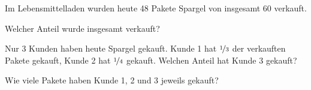 \begin{aufgabe}[subtitle=Spargelpakete]
	Im Lebensmittelladen wurden heute 48 Pakete Spargel von insgesamt 60 verkauft.
	\begin{teilaufgaben}
		\teilaufgabe
		Welcher Anteil wurde insgesamt verkauft?
		
		\teilaufgabe
		Nur 3 Kunden haben heute Spargel gekauft. Kunde 1 hat $\nicefrac{1}{3}$ der verkauften Pakete gekauft,
		Kunde 2 hat $\nicefrac{1}{4}$ gekauft. Welchen Anteil 
		hat Kunde 3 gekauft?
		
		\teilaufgabe
		Wie viele Pakete haben Kunde 1, 2 und 3 jeweils gekauft?
	\end{teilaufgaben}
	
	\begin{loesung}
		\begin{teilaufgaben}
		\end{teilaufgaben}
	\end{loesung}
	
	\begin{erwartungen}
	\end{erwartungen}
\end{aufgabe}